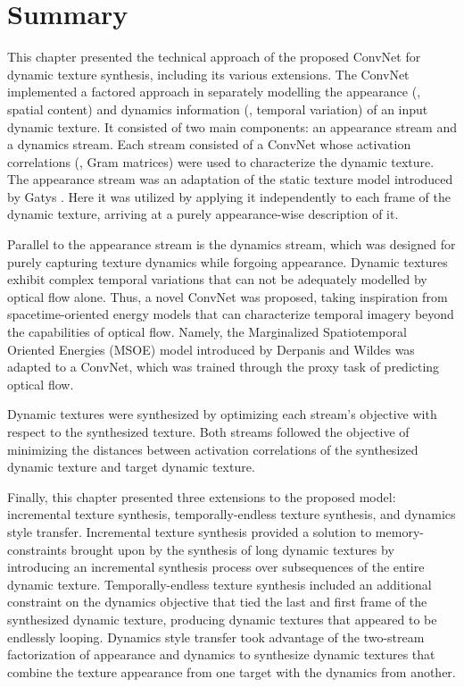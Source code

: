 \section{Summary}

This chapter presented the technical approach of the proposed ConvNet for dynamic texture synthesis, including its various extensions. The ConvNet implemented a factored approach in separately modelling the appearance (\ie, spatial content) and dynamics information (\ie, temporal variation) of an input dynamic texture. It consisted of two main components: an appearance stream and a dynamics stream. Each stream consisted of a ConvNet whose activation correlations (\ie, Gram matrices) were used to characterize the dynamic texture. The appearance stream was an adaptation of the static texture model introduced by Gatys \etal \cite{gatys2015}. Here it was utilized by applying it independently to each frame of the dynamic texture, arriving at a purely appearance-wise description of it.

Parallel to the appearance stream is the dynamics stream, which was designed for purely capturing texture dynamics while forgoing appearance. Dynamic textures exhibit complex temporal variations that can not be adequately modelled by optical flow alone. Thus, a novel ConvNet was proposed, taking inspiration from spacetime-oriented energy models \cite{derpanis2012spacetime,simoncelli1998} that can characterize temporal imagery beyond the capabilities of optical flow. Namely, the Marginalized Spatiotemporal Oriented Energies (MSOE) model introduced by Derpanis and Wildes \cite{derpanis2012spacetime} was adapted to a ConvNet, which was trained through the proxy task of predicting optical flow.

Dynamic textures were synthesized by optimizing each stream's objective with respect to the synthesized texture. Both streams followed the objective of minimizing the distances between activation correlations of the synthesized dynamic texture and target dynamic texture.

Finally, this chapter presented three extensions to the proposed model: incremental texture synthesis, temporally-endless texture synthesis, and dynamics style transfer. Incremental texture synthesis provided a solution to memory-constraints brought upon by the synthesis of long dynamic textures by introducing an incremental synthesis process over subsequences of the entire dynamic texture. Temporally-endless texture synthesis included an additional constraint on the dynamics objective that tied the last and first frame of the synthesized dynamic texture, producing dynamic textures that appeared to be endlessly looping. Dynamics style transfer took advantage of the two-stream factorization of appearance and dynamics to synthesize dynamic textures that combine the texture appearance from one target with the dynamics from another.